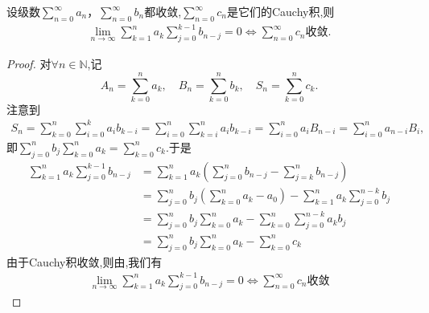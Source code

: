 \documentclass[../../main.tex]{subfiles}%
\begin{document}
\begin{proposition}\label{proposition:命题EQ:13---92788648184FDAG.....2}
设级数\(\sum_{n = 0}^{\infty} a_n\)，\(\sum_{n = 0}^{\infty} b_n\)都收敛,\(\sum_{n = 0}^{\infty} c_n\)是它们的Cauchy积,则
\begin{align}
\lim\limits_{n\to\infty} \sum\limits_{k=1}^{n} a_k \sum\limits_{j=0}^{k-1} b_{n-j} = 0 \iff \sum\limits_{n=0}^{\infty} c_n \text{收敛}.
\end{align}
\end{proposition}
\begin{proof}

对$\forall n\in \mathbb{N}$,记
\[
A_n = \sum_{k = 0}^{n} a_k,\quad B_n = \sum_{k = 0}^{n} b_k,\quad S_n = \sum_{k = 0}^{n} c_k.
\]
注意到
\begin{align*}
S_n = \sum\limits_{k=0}^{n} \sum\limits_{i=0}^{k} a_i b_{k-i} = \sum\limits_{i=0}^{n} \sum\limits_{k=i}^{n} a_i b_{k-i} = \sum\limits_{i=0}^{n} a_i B_{n-i} = \sum\limits_{i=0}^{n} a_{n-i} B_i,
\end{align*}
即$\sum\limits_{j=0}^{n} b_j \sum\limits_{k=0}^{n} a_k =\sum\limits_{k=0}^{n} c_k.$于是
\begin{align*}
\sum\limits_{k=1}^{n} a_k \sum\limits_{j=0}^{k-1} b_{n-j} &= \sum\limits_{k=1}^{n} a_k \left( \sum\limits_{j=0}^{n} b_{n-j} - \sum\limits_{j=k}^{n} b_{n-j} \right) \\
&= \sum\limits_{j=0}^{n} b_j \left( \sum\limits_{k=0}^{n} a_k - a_0 \right) - \sum\limits_{k=1}^{n} a_k \sum\limits_{j=0}^{n-k} b_j \\
&= \sum\limits_{j=0}^{n} b_j \sum\limits_{k=0}^{n} a_k - \sum\limits_{k=0}^{n} \sum\limits_{j=0}^{n-k} a_k b_j \\
&= \sum\limits_{j=0}^{n} b_j \sum\limits_{k=0}^{n} a_k - \sum\limits_{k=0}^{n} c_k
\end{align*}
由于Cauchy积收敛,则由,我们有
\begin{align*}
\lim\limits_{n\to\infty} \sum\limits_{k=1}^{n} a_k \sum\limits_{j=0}^{k-1} b_{n-j} = 0 \iff \sum\limits_{n=0}^{\infty} c_n \text{收敛}
\end{align*}

\end{proof}
\end{document}
